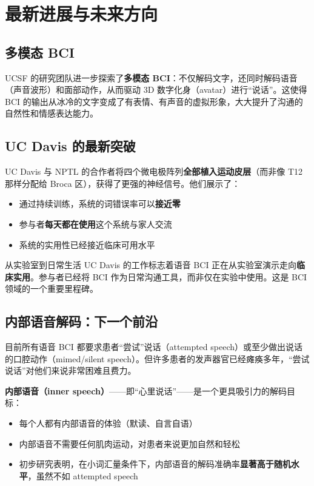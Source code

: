 \section{最新进展与未来方向}

\subsection{多模态 BCI}

UCSF 的研究团队进一步探索了\textbf{多模态 BCI}：不仅解码文字，还同时解码语音（声音波形）和面部动作，从而驱动 3D 数字化身（avatar）进行``说话''。这使得 BCI 的输出从冰冷的文字变成了有表情、有声音的虚拟形象，大大提升了沟通的自然性和情感表达能力。

\subsection{UC Davis 的最新突破}

UC Davis 与 NPTL 的合作者将四个微电极阵列\textbf{全部植入运动皮层}（而非像 T12 那样分配给 Broca 区），获得了更强的神经信号。他们展示了：

\begin{itemize}
    \item 通过持续训练，系统的词错误率可以\textbf{接近零}
    \item 参与者\textbf{每天都在使用}这个系统与家人交流
    \item 系统的实用性已经接近临床可用水平
\end{itemize}

\begin{importantbox}{从实验室到日常生活}
UC Davis 的工作标志着语音 BCI 正在从实验室演示走向\textbf{临床实用}。参与者已经将 BCI 作为日常沟通工具，而非仅在实验中使用。这是 BCI 领域的一个重要里程碑。
\end{importantbox}

\subsection{内部语音解码：下一个前沿}

目前所有语音 BCI 都要求患者``尝试''说话（attempted speech）或至少做出说话的口腔动作（mimed/silent speech）。但许多患者的发声器官已经瘫痪多年，``尝试说话''对他们来说非常困难且费力。

\textbf{内部语音（inner speech）}——即``心里说话''——是一个更具吸引力的解码目标：

\begin{itemize}
    \item 每个人都有内部语音的体验（默读、自言自语）
    \item 内部语音不需要任何肌肉运动，对患者来说更加自然和轻松
    \item 初步研究表明，在小词汇量条件下，内部语音的解码准确率\textbf{显著高于随机水平}，虽然不如 attempted speech
\end{itemize}

